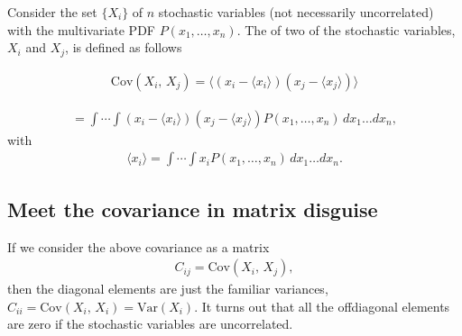 \documentclass[letterpaper,10pt,english]{sphinxmanual}
\begin{document}
Consider the set \(\{X_i\}\) of \(n\)
stochastic variables (not necessarily uncorrelated) with the
multivariate PDF \(P(x_1,\dots,x_n)\). The  of two
of the stochastic variables, \(X_i\) and \(X_j\), is defined as follows




\begin{equation*}
\begin{split}
\begin{equation}
\mathrm{Cov}(X_i,\,X_j)  = \langle (x_i-\langle x_i\rangle)(x_j-\langle x_j\rangle)\rangle 
\label{_auto2} \tag{4}
\end{equation}
\end{split}
\end{equation*}



\begin{equation*}
\begin{split}
\begin{equation} 
=\int\cdots\int (x_i-\langle x_i\rangle)(x_j-\langle x_j\rangle)P(x_1,\dots,x_n)\,dx_1\dots dx_n,
\label{eq:def_covariance} \tag{5}
\end{equation}
\end{split}
\end{equation*}
with
\begin{equation*}
\begin{split}
\langle x_i\rangle =
\int\cdots\int x_i P(x_1,\dots,x_n)\,dx_1\dots dx_n.
\end{split}
\end{equation*}

\subsection{Meet the  covariance in matrix disguise}
\label{\detokenize{chapter2:meet-the-covariance-in-matrix-disguise}}
If we consider the above covariance as a matrix
\begin{equation*}
\begin{split}
C_{ij} =\mathrm{Cov}(X_i,\,X_j),
\end{split}
\end{equation*}
then the diagonal elements are just the familiar
variances, \(C_{ii} = \mathrm{Cov}(X_i,\,X_i) = \mathrm{Var}(X_i)\). It turns out that
all the off\sphinxhyphen{}diagonal elements are zero if the stochastic variables are
uncorrelated.
\end{document}
